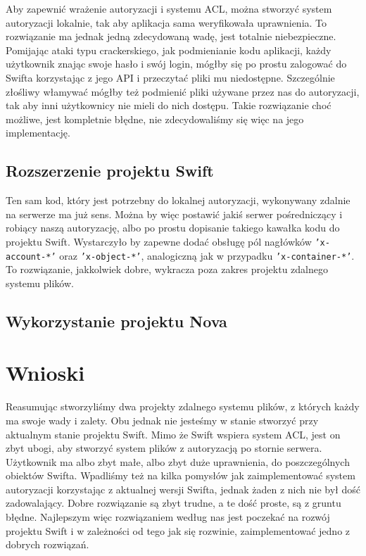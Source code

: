 	Aby zapewnić wrażenie autoryzacji i systemu ACL, można stworzyć system autoryzacji lokalnie, tak aby aplikacja sama weryfikowała uprawnienia. To rozwiązanie ma jednak jedną zdecydowaną wadę, jest totalnie niebezpieczne. Pomijając ataki typu crackerskiego, jak podmienianie kodu aplikacji, każdy użytkownik znając swoje hasło i swój login, mógłby się po prostu zalogować do Swifta korzystając z jego API i przeczytać pliki mu niedostępne. Szczególnie złośliwy włamywać mógłby też podmienić pliki używane przez nas do autoryzacji, tak aby inni użytkownicy nie mieli do nich dostępu. Takie rozwiązanie choć możliwe, jest kompletnie błędne, nie zdecydowaliśmy się więc na jego implementację.

	\subsection{Rozszerzenie projektu Swift}\label{sub:rozszerzenie projektu swift}

	Ten sam kod, który jest potrzebny do lokalnej autoryzacji, wykonywany zdalnie na serwerze ma już sens. Można by więc postawić jakiś serwer pośredniczący i robiący naszą autoryzację, albo po prostu dopisanie takiego kawałka kodu do projektu Swift. Wystarczyło by zapewne dodać obsługę pól nagłówków \texttt{'x-account-*'} oraz \texttt{'x-object-*'}, analogiczną jak w przypadku \texttt{'x-container-*'}. To rozwiązanie, jakkolwiek dobre, wykracza poza zakres projektu zdalnego systemu plików.
	
	\subsection{Wykorzystanie projektu Nova}\label{sub:wykorzystanie projektu nova}
	
	\section{Wnioski}\label{sec:wnioski}

	Reasumując stworzyliśmy dwa projekty zdalnego systemu plików, z których każdy ma swoje wady i zalety. Obu jednak nie jesteśmy w stanie stworzyć przy aktualnym stanie projektu Swift. Mimo że Swift wspiera system ACL, jest on zbyt ubogi, aby stworzyć system plików z autoryzacją po stornie serwera. Użytkownik ma albo zbyt małe, albo zbyt duże uprawnienia, do poszczególnych obiektów Swifta. Wpadliśmy też na kilka pomysłów jak zaimplementować system autoryzacji korzystając z aktualnej wersji Swifta, jednak żaden z nich nie był dość zadowalający. Dobre rozwiązanie są zbyt trudne, a te dość proste, są z gruntu błędne. Najlepszym więc rozwiązaniem według nas jest poczekać na rozwój projektu Swift i w zależności od tego jak się rozwinie, zaimplementować jedno z dobrych rozwiązań.




